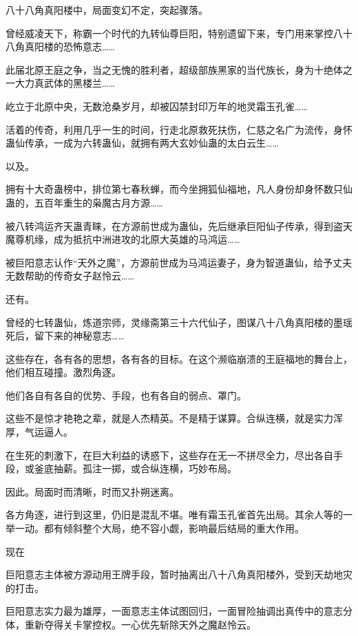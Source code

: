 
\begin{this_body}



八十八角真阳楼中，局面变幻不定，突起骤落。

曾经威凌天下，称霸一个时代的九转仙尊巨阳，特别遗留下来，专门用来掌控八十八角真阳楼的恐怖意志……

此届北原王庭之争，当之无愧的胜利者，超级部族黑家的当代族长，身为十绝体之一大力真武体的黑楼兰……

屹立于北原中央，无数沧桑岁月，却被囚禁封印万年的地灵霜玉孔雀……

活着的传奇，利用几乎一生的时间，行走北原救死扶伤，仁慈之名广为流传，身怀蛊仙传承，一成为六转蛊仙，就拥有两大玄妙仙蛊的太白云生……

以及。

拥有十大奇蛊榜中，排位第七春秋蝉，而今坐拥狐仙福地，凡人身份却身怀数只仙蛊的，五百年重生的枭魔古月方源……

被八转鸿运齐天蛊青睐，在方源前世成为蛊仙，先后继承巨阳仙子传承，得到盗天魔尊机缘，成为抵抗中洲进攻的北原大英雄的马鸿运……

被巨阳意志认作“天外之魔”，方源前世成为马鸿运妻子，身为智道蛊仙，给予丈夫无数帮助的传奇女子赵怜云……

还有。

曾经的七转蛊仙，炼道宗师，灵缘斋第三十六代仙子，图谋八十八角真阳楼的墨瑶死后，留下来的神秘意志……

这些存在，各有各的思想，各有各的目标。在这个濒临崩溃的王庭福地的舞台上，他们相互碰撞。激烈角逐。

他们各自有各自的优势、手段，也有各自的弱点、罩门。

这些不是惊才艳艳之辈，就是人杰精英。不是精于谋算。合纵连横，就是实力浑厚，气运逼人。

在生死的刺激下，在巨大利益的诱惑下，这些存在无一不拼尽全力，尽出各自手段，或釜底抽薪。孤注一掷，或合纵连横，巧妙布局。

因此。局面时而清晰，时而又扑朔迷离。

各方角逐，进行到这里，仍旧是混乱不堪。唯有霜玉孔雀首先出局。其余人等的一举一动。都有倾斜整个大局，绝不容小觑，影响最后结局的重大作用。

现在

巨阳意志主体被方源动用王牌手段，暂时抽离出八十八角真阳楼外，受到天劫地灾的打击。

巨阳意志实力最为雄厚，一面意志主体试图回归，一面冒险抽调出真传中的意志分体，重新夺得关卡掌控权。一心优先斩除天外之魔赵怜云。


\end{this_body}
